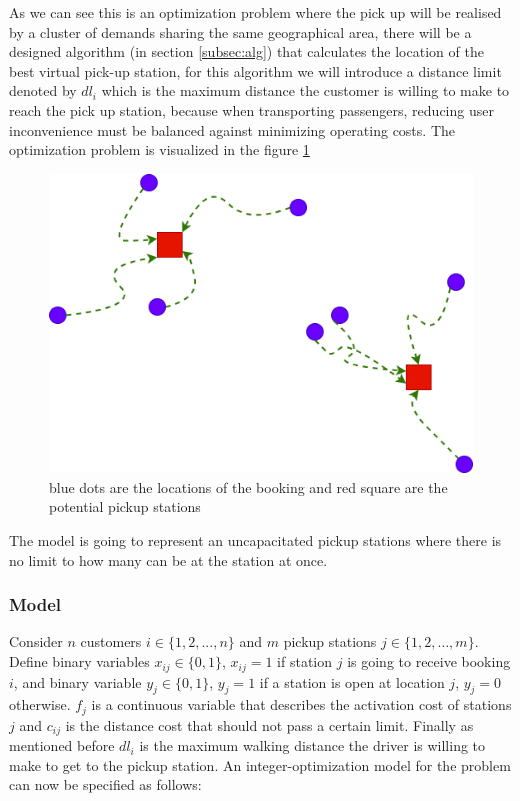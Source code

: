 \documentclass{article}
\begin{document}
\label{sec:walk_limit}
As we can see this is an optimization problem where the pick up will be realised by a cluster of demands sharing the same geographical area, there will be a designed algorithm (in section \ref{subsec:alg})
that calculates the location of the best virtual pick-up station, for this algorithm we will introduce a distance limit denoted by $dl_i$ which is the maximum distance the customer is willing to make to reach the pick up station,  because when transporting passengers, reducing user inconvenience must be balanced against minimizing operating costs. The optimization problem is visualized in the figure \ref{fig:p-median}

\begin{figure}[H]
    \centering 
  \includegraphics[width=\linewidth]{pictures/pmedian}
  \caption{blue dots are the locations of the booking and red square are the potential pickup stations}
\label{fig:p-median}
\end{figure}

The model is going to represent an uncapacitated  pickup stations where there is no limit to how many can be at the station at once.


\subsubsection{Model}
\label{subsection:model_partI}

Consider $n$ customers $i \in \{1,2,...,n\}$ and $m$ pickup stations $ j \in \{1,2,…,m\}$. Define binary variables $x_{ij} \in \{0, 1\}$,  $x_{ij} = 1$ if station $j$ is going to receive booking $i$, 
and binary variable $y_{j} \in \{0,1\}$, $y_{j}= 1$ if a station is open at location $j$, $y_{j}=0$ otherwise. $f_j$ is a continuous variable that describes the activation cost of stations $j$ and $c_{ij}$ is the distance cost that should not pass a certain limit.
Finally as mentioned before $dl_i$ is the maximum walking distance the driver is willing to make to get to the pickup station.
 An integer-optimization model for the problem can now be specified as follows:
\end{document}
